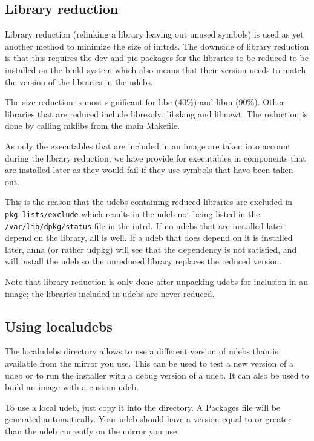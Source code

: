 \documentclass[a4paper,10pt]{article}
\begin{document}
\subsection{Library reduction}
Library reduction (relinking a library leaving out unused symbols) is used as yet another method to minimize the size of initrds. The downside of library reduction is that this requires the dev and pic packages for the libraries to be reduced to be installed on the build system which also means that their version needs to match the version of the libraries in the udebs. 

The size reduction is most significant for libc (40\%) and libm (90\%). Other libraries that are reduced include libresolv, libslang and libnewt. The reduction is done by calling mklibs from the main Makefile. 

As only the executables that are included in an image are taken into account during the library reduction, we have provide for executables in components that are installed later as they would fail if they use symbols that have been taken out. 

This is the reason that the udebs containing reduced libraries are excluded in \texttt{pkg-lists/exclude} which results in the udeb not being listed in the \texttt{/var/lib/dpkg/status} file in the intrd. If no udebs that are installed later depend on the library, all is well. If a udeb that does depend on it is installed later, anna (or rather udpkg) will see that the dependency is not satisfied, and will install the udeb so the unreduced library replaces the reduced version. 

Note that library reduction is only done after unpacking udebs for inclusion in an image; the libraries included in udebs are never reduced. 


\subsection{Using localudebs}
The localudebs directory allows to use a different version of udebs than is available from the mirror you use. This can be used to test a new version of a udeb or to run the installer with a debug version of a udeb. It can also be used to build an image with a custom udeb. 

To use a local udeb, just copy it into the directory. A Packages file will be generated automatically. Your udeb should have a version equal to or greater than the udeb currently on the mirror you use. 
\end{document}
